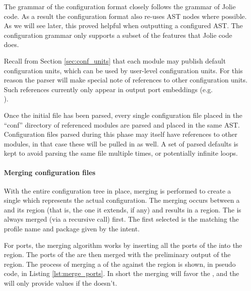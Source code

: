 The grammar of the configuration format closely follows the grammar of Jolie
code. As a result the configuration format also re-uses AST nodes where
possible. As we will see later, this proved helpful when outputting a
configured AST. The configuration grammar only supports a subset of the
features that Jolie code does.

Recall from Section \ref{sec:conf_units} that each module may publish default
configuration units, which can be used by user-level configuration units. For
this reason the parser will make special note of references to other
configuration units. Such references currently only appear in output port
embeddings (e.g. \\).

Once the initial file has been parsed, every single configuration file placed
in the ``conf'' directory of referenced modules are parsed and placed in the
same AST. Configuration files parsed during this phase may itself have
references to other modules, in that case these will be pulled in as well.  A
set of parsed defaults is kept to avoid parsing the same file multiple times,
or potentially infinite loops.

\paragraph{Merging configuration files}

With the entire configuration tree in place, merging is performed to create a
single  which represents the actual configuration. The merging
occurs between a  and its  region (that is, the one it
        extends, if any) and results in a  region. The
 is always merged (via a recursive call) first. The first
 selected is the  matching the profile name and
package given by the intent.

For ports, the merging algorithm works by inserting all the ports of the
 into the  region. The ports of the  are
then merged with the preliminary output of the  region. The
process of merging a  of the  against the 
region is shown, in pseudo code, in Listing \ref{lst:merge_ports}. In short the
merging will favor the , and the  will only provide
values if the  doesn't.

